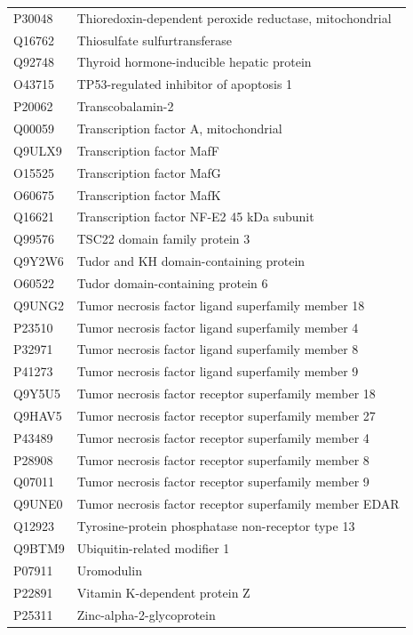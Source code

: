 \documentclass[10pt,twoside]{article}
\begin{document}
\begin{longtable}{lL{0.75\textwidth}}
P30048	&	Thioredoxin-dependent peroxide reductase, mitochondrial 	\\
Q16762	&	Thiosulfate sulfurtransferase 	\\
Q92748	&	Thyroid hormone-inducible hepatic protein 	\\
O43715	&	TP53-regulated inhibitor of apoptosis 1 	\\
P20062	&	Transcobalamin-2 	\\
Q00059	&	Transcription factor A, mitochondrial 	\\
Q9ULX9	&	Transcription factor MafF 	\\
O15525	&	Transcription factor MafG 	\\
O60675	&	Transcription factor MafK 	\\
Q16621	&	Transcription factor NF-E2 45 kDa subunit 	\\
Q99576	&	TSC22 domain family protein 3 	\\
Q9Y2W6	&	Tudor and KH domain-containing protein 	\\
O60522	&	Tudor domain-containing protein 6 	\\
Q9UNG2	&	Tumor necrosis factor ligand superfamily member 18 	\\
P23510	&	Tumor necrosis factor ligand superfamily member 4 	\\
P32971	&	Tumor necrosis factor ligand superfamily member 8 	\\
P41273	&	Tumor necrosis factor ligand superfamily member 9 	\\
Q9Y5U5	&	Tumor necrosis factor receptor superfamily member 18 	\\
Q9HAV5	&	Tumor necrosis factor receptor superfamily member 27 	\\
P43489	&	Tumor necrosis factor receptor superfamily member 4 	\\
P28908	&	Tumor necrosis factor receptor superfamily member 8 	\\
Q07011	&	Tumor necrosis factor receptor superfamily member 9 	\\
Q9UNE0	&	Tumor necrosis factor receptor superfamily member EDAR 	\\
Q12923	&	Tyrosine-protein phosphatase non-receptor type 13 	\\
Q9BTM9	&	Ubiquitin-related modifier 1	\\
P07911	&	Uromodulin 	\\
P22891	&	Vitamin K-dependent protein Z	\\
P25311	&	Zinc-alpha-2-glycoprotein 	\\
\end{longtable}
\end{document}
